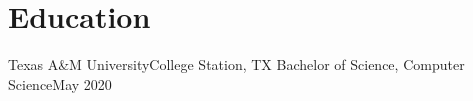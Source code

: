 \section{Education}
\resumeSubHeadingListStart

\resumeSubheading
{Texas A\&M University}{College Station, TX}
{Bachelor of Science, Computer Science}{May 2020}

\resumeSubHeadingListEnd
